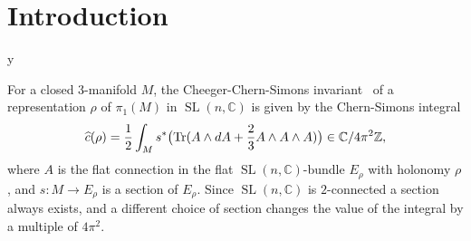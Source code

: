 \documentclass[11pt]{amsart}
\theoremstyle{definition}
\numberwithin{equation}{section}
\def\printname#1{
        \if\draft y
                \smash{\makebox[0pt]{\hspace{-0.5in}
                        \raisebox{8pt}{\tt\tiny #1}}}
        \fi
}
\def\lbl#1{\label{#1}\printname{#1}}
\DeclareMathOperator{\SL}{SL}
\DeclareMathOperator{\Tr}{Tr}
\newcommand{\C}{\mathbb C}
\newcommand{\Z}{\mathbb Z}
\newcommand{\B}{\mathcal B}
\def\Tr{\mathrm{Tr}}
\begin{document}
\begin{abstract}
For a compact 3-manifold $M$ with arbitrary (possibly empty) boundary, we 
give a parametrization of the set of conjugacy classes of boundary-unipotent 
representations of $\pi_1(M)$ into $\SL(n,\C)$. Our parametrization uses
Ptolemy coordinates, which are inspired by coordinates on higher 
Teichm\"{u}ller spaces due to Fock and Goncharov. We show that a 
boundary-unipotent representation determines an element in Neumann's extended 
Bloch group $\widehat\B(\C)$, and use this to obtain an efficient formula for 
the Cheeger-Chern-Simons invariant, and in particular for the volume. 
Computations for the census manifolds show that boundary-unipotent 
representations are abundant, and
numerical comparisons with census volumes, suggest that the volume of a 
representation is an integral linear 
combination of volumes of hyperbolic $3$-manifolds. This is in agreement with 
a conjecture of Walter Neumann, stating that the Bloch group is generated by 
hyperbolic manifolds.
\end{abstract}




\maketitle

\tableofcontents



\section{Introduction}
\lbl{sec.intro}

For a closed 3-manifold $M$, the Cheeger-Chern-Simons 
invariant~\cite{CheegerSimons,ChernSimons} of a representation 
$\rho$ of $\pi_1(M)$ in $\SL(n,\C)$ is given by the Chern-Simons integral
\begin{equation}
\lbl{ChernSimonsintegral}
\widehat c(\rho)=\frac{1}{2}\int_Ms^*
\big(\Tr(A\wedge dA+\frac{2}{3}A\wedge A\wedge A)\big)\in \C/4\pi^2\Z,
\end{equation}
where $A$ is the flat connection in the flat $\SL(n,\C)$-bundle $E_\rho$ 
with holonomy $\rho$, and $s\colon M\to E_\rho$ is a section of $E_\rho$. 
Since $\SL(n,\C)$ is $2$-connected a section always exists, and a different 
choice of section changes the value of the integral by a multiple of $4\pi^2$.
\end{document}

